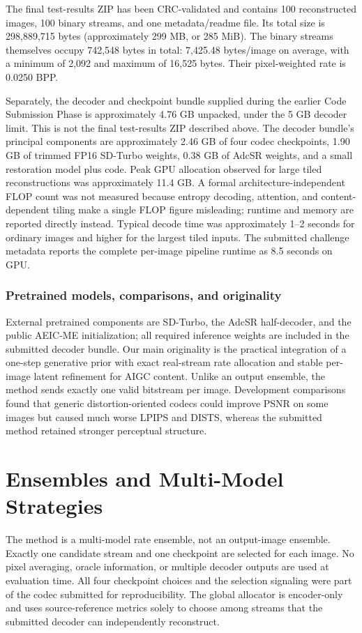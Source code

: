 \documentclass[10pt,twocolumn,letterpaper]{article}
\begin{document}
The final test-results ZIP has been CRC-validated and contains 100 reconstructed images, 100 binary streams, and one metadata/readme file. Its total size is 298,889,715 bytes (approximately 299 MB, or 285 MiB). The binary streams themselves occupy 742,548 bytes in total: 7,425.48 bytes/image on average, with a minimum of 2,092 and maximum of 16,525 bytes. Their pixel-weighted rate is 0.0250 BPP.

Separately, the decoder and checkpoint bundle supplied during the earlier Code Submission Phase is approximately 4.76 GB unpacked, under the 5 GB decoder limit. This is not the final test-results ZIP described above. The decoder bundle's principal components are approximately 2.46 GB of four codec checkpoints, 1.90 GB of trimmed FP16 SD-Turbo weights, 0.38 GB of AdcSR weights, and a small restoration model plus code. Peak GPU allocation observed for large tiled reconstructions was approximately 11.4 GB. A formal architecture-independent FLOP count was not measured because entropy decoding, attention, and content-dependent tiling make a single FLOP figure misleading; runtime and memory are reported directly instead. Typical decode time was approximately 1--2 seconds for ordinary images and higher for the largest tiled inputs. The submitted challenge metadata reports the complete per-image pipeline runtime as 8.5 seconds on GPU.

\subsubsection{Pretrained models, comparisons, and originality}
External pretrained components are SD-Turbo, the AdcSR half-decoder, and the public AEIC-ME initialization; all required inference weights are included in the submitted decoder bundle. Our main originality is the practical integration of a one-step generative prior with exact real-stream rate allocation and stable per-image latent refinement for AIGC content. Unlike an output ensemble, the method sends exactly one valid bitstream per image. Development comparisons found that generic distortion-oriented codecs could improve PSNR on some images but caused much worse LPIPS and DISTS, whereas the submitted method retained stronger perceptual structure.

\section{Ensembles and Multi-Model Strategies}
The method is a multi-model rate ensemble, not an output-image ensemble. Exactly one candidate stream and one checkpoint are selected for each image. No pixel averaging, oracle information, or multiple decoder outputs are used at evaluation time. All four checkpoint choices and the selection signaling were part of the codec submitted for reproducibility. The global allocator is encoder-only and uses source-reference metrics solely to choose among streams that the submitted decoder can independently reconstruct.
\end{document}
